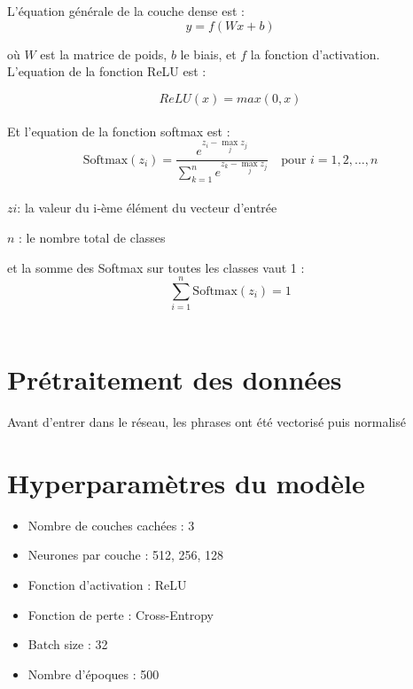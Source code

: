 \documentclass[a4paper,12pt]{report}
\begin{document}
L'équation générale de la couche dense est :
\[
	y = f(Wx + b)
\]

où $W$ est la matrice de poids, $b$ le biais, et $f$ la fonction d'activation.\\

L'equation de la fonction ReLU est :

\[
	ReLU(x)=max(0,x)
\]\\

Et l'equation de la fonction softmax est :\\

\[
\text{Softmax}(z_i) = \frac{e^{z_i - \max_j z_j}}{\sum_{k=1}^{n} e^{z_k - \max_j z_j}} \quad \text{pour } i = 1, 2, \dots, n
\]\\

$zi$: la valeur du i‑ème élément du vecteur d’entrée

$n$ : le nombre total de classes

et la somme des Softmax sur toutes les classes vaut 1 :
\[
\sum_{i=1}^{n} \text{Softmax}(z_i) = 1
\]\\

\section{Prétraitement des données}
Avant d'entrer dans le réseau, les phrases ont été vectorisé puis normalisé

\section{Hyperparamètres du modèle}
\begin{itemize}
    \item Nombre de couches cachées : 3
    \item Neurones par couche : 512, 256, 128
    \item Fonction d'activation : ReLU
    \item Fonction de perte : Cross-Entropy
    \item Batch size : 32
    \item Nombre d'époques : 500
\end{itemize}






\end{document}
